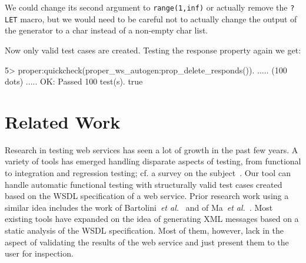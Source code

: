 \documentclass[copyright]{eptcs}
\newcommand{\LET}{\texttt{?LET}\xspace}
\begin{document}
We could change its second argument to \texttt{range(1,inf)} or
actually remove the \LET macro, but we would need to be careful not to
actually change the output of the generator to a char instead of a
non-empty char list.

Now only valid test cases are created. Testing the response property again we 
get:
\vfill\eject
\begin{lstoutput}
5> proper:quickcheck(proper_ws_autogen:prop_delete_responds()).
..... (100 dots) .....
OK: Passed 100 test(s).
true
\end{lstoutput}


\section{Related Work} \label{sec:related}

Research in testing web services has seen a lot of growth in the past
few years. A variety of tools has emerged handling disparate aspects
of testing, from functional to integration and regression testing; cf.
a survey on the subject~\cite{SOATesting@springerlink-09}. Our tool
can handle automatic functional testing with structurally valid
test cases created based on the WSDL specification of a web service.
Prior research work using a similar idea includes the work of
Bartolini~\textit{et al.}~\cite{bartolini@ICSOC-08} and of
Ma~\textit{et al.}~\cite{automated@IC-08}. Most existing tools have
expanded on the idea of generating XML messages based on a static
analysis of the WSDL specification. Most of them, however, lack in the
aspect of validating the results of the web service and just present
them to the user for inspection.
\end{document}
